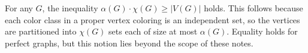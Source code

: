 \begin{remark} \label{remark:relationship_between_independence_number_and_chromatic_number}
For any  $G$, the inequality $\alpha(G) \cdot \chi(G) \geq |V(G)|$ holds. This follows because each color class in a proper vertex coloring is an independent set, so the vertices are partitioned into $\chi(G)$ sets each of size at most $\alpha(G)$. Equality holds for perfect graphs, but this notion lies beyond the scope of these notes.
\end{remark}
